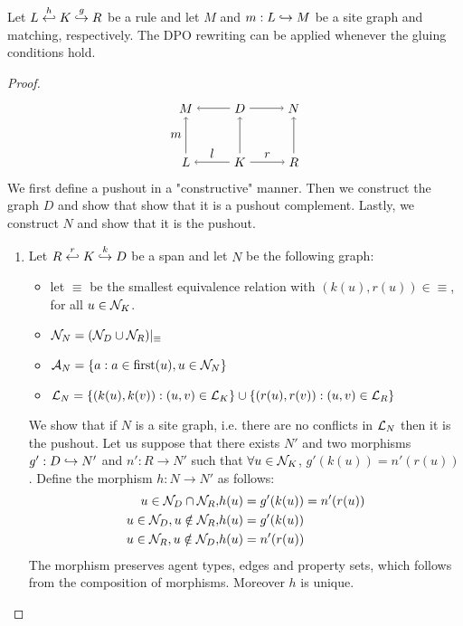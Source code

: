 \begin{lemma}
  Let $L\overset{h}{\hookleftarrow} K \overset{g}{\hookrightarrow} R$ be a rule and let $M$ and $m:L\hookrightarrow M$ be a site graph and matching, respectively. The DPO rewriting can be applied whenever the gluing conditions hold.
\end{lemma}
\begin{proof}
  \[
  \begin{tikzpicture} %
    \node (l) at (-1.5,0) {\(L\)};
    \node (d) at (0,0) {\(K\)};
    \node (r) at (1.5,0) {\(R\)};
    \node (m) at (-1.5,1.5) {\(M\)};
    \node (d') at (0,1.5) {\(D\)};
    \node (n) at (1.5,1.5) {\(N\)};
    \draw [->] (d) -- node [above,midway] {\(l\)} (l);
    \draw [->] (d) -- node [above,midway] {\(r\)} (r);
    \draw [->] (d') -- (m);
    \draw [->] (d') -- (n);
    \draw [->] (l) -- node [left,midway] {\(m\)}  (m);
    \draw [->] (d) -- (d');
    \draw [->] (r) -- (n);
  \end{tikzpicture}
  \]
  We first define a pushout in a "constructive" manner. Then we construct the graph $D$ and show that show that it is a pushout complement. Lastly, we construct $N$ and show that it is the pushout.

  \begin{enumerate}
  \item Let $R\overset{r}{\hookleftarrow}K\overset{k}{\hookrightarrow} D$ be a span and let $N$ be the following graph:
    \begin{itemize}
    \item let $\equiv$ be the smallest equivalence relation with $(k(u),r(u))\in\equiv$, for all $u\in\mathcal{N}_K$.
    \item $\mathcal{N}_N = (\mathcal{N}_D\cup \mathcal{N}_R)|_{\equiv}$
    \item $\mathcal{A}_N = \{a: a\in \text{first}(u), u\in\mathcal{N}_N\}$
    \item $\mathcal{L}_N = \{(k(u),k(v)) : (u,v)\in\mathcal{L}_K\}\cup\{(r(u),r(v)) : (u,v)\in\mathcal{L}_R\}$
    \end{itemize}
    We show that if $N$ is a site graph, i.e. there are no conflicts in $\mathcal{L}_N$ then it is the pushout. Let us suppose that there exists $N'$ and two morphisms $g':D\hookrightarrow N'$ and $n':R\to N'$ such that $\forall u\in\mathcal{N}_K$, $g'(k(u)) = n'(r(u))$. Define the morphism $h:N\to N'$ as follows:
    \begin{align*}
      u\in \mathcal{N}_D\cap\mathcal{N}_R, &h(u) = g'(k(u)) = n'(r(u))\\
      u\in \mathcal{N}_D, u\notin\mathcal{N}_R, &h(u) = g'(k(u))\\
      u\in \mathcal{N}_R, u\notin\mathcal{N}_D, &h(u) = n'(r(u))
    \end{align*}
    The morphism preserves agent types, edges and property sets, which follows from the composition of morphisms. Moreover $h$ is unique.


\end{enumerate}
\end{proof}
